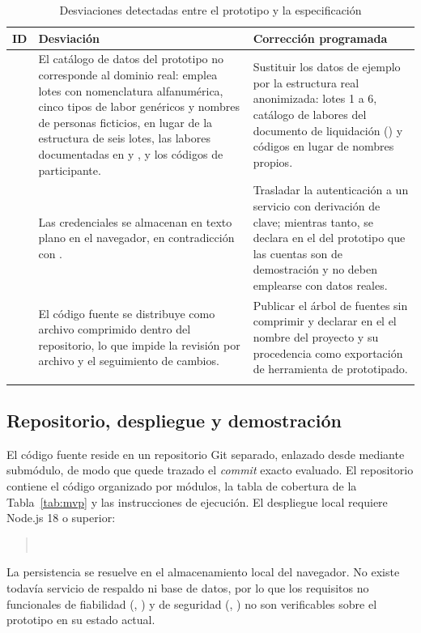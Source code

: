\begin{longtable}{|C{1.4cm}|L{6.6cm}|L{7.0cm}|}
\hline
{}\textbf{ID} & \textbf{Desviación} & \textbf{Corrección programada} \\
\hline
\endhead
{} & El catálogo de datos del prototipo no corresponde al dominio real: emplea lotes con nomenclatura alfanumérica, cinco tipos de labor genéricos y nombres de personas ficticios, en lugar de la estructura de seis lotes, las labores documentadas en  y , y los códigos de participante. & Sustituir los datos de ejemplo por la estructura real anonimizada: lotes 1 a 6, catálogo de labores del documento de liquidación () y códigos  en lugar de nombres propios. \\ \hline
{} & Las credenciales se almacenan en texto plano en el navegador, en contradicción con . & Trasladar la autenticación a un servicio con derivación de clave; mientras tanto, se declara en el  del prototipo que las cuentas son de demostración y no deben emplearse con datos reales. \\ \hline
{} & El código fuente se distribuye como archivo comprimido dentro del repositorio, lo que impide la revisión por archivo y el seguimiento de cambios. & Publicar el árbol de fuentes sin comprimir y declarar en el  el nombre del proyecto y su procedencia como exportación de herramienta de prototipado. \\ \hline
\caption{Desviaciones detectadas entre el prototipo y la especificación}
\end{longtable}

\subsection{Repositorio, despliegue y demostración}

El código fuente reside en un repositorio Git separado, enlazado desde 
mediante submódulo, de modo que quede trazado el \emph{commit} exacto evaluado. El repositorio
contiene el código organizado por módulos, la tabla de cobertura de la Tabla~\ref{tab:mvp} y las
instrucciones de ejecución. El despliegue local requiere Node.js 18 o superior:

\begin{quote}
\\
\end{quote}

\noindent
La persistencia se resuelve en el almacenamiento local del navegador. No existe todavía servicio de
respaldo ni base de datos, por lo que los requisitos no funcionales de fiabilidad
(, ) y de seguridad (, ) no son verificables sobre el
prototipo en su estado actual.

